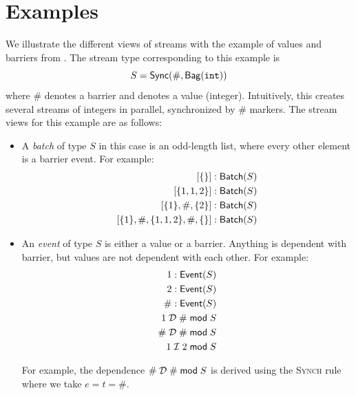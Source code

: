 \section{Examples}

We illustrate the different views of streams with the example of values and barriers from . The stream type corresponding to this example is
\[
S = \mathsf{Sync}({\#}, \mathsf{Bag}({\texttt{int}}))
\]
where $\#$ denotes a barrier and  denotes a value (integer).
Intuitively, this creates several streams of integers in parallel, synchronized by $\#$ markers.
The stream views for this example are as follows:
\begin{itemize}
\item A \emph{batch} of type $S$ in this case is an odd-length list, where every other element is a barrier event. For example:
\begin{align*}
  \batchtype{[\{\}]}{S}& \\
  \batchtype{[\{1, 1, 2\}]}{S}& \\
  \batchtype{[\{1\}, \#, \{2\}]}{S}& \\
  \batchtype{[\{1\}, \#, \{1, 1, 2\}, \#, \{\}]}{S}&
\end{align*}
\item An \emph{event} of type $S$ is either a value or a barrier. Anything is dependent with barrier, but values are not dependent with each other. For example:
\begin{align*}
  1: \mathsf{Event}({S})& \\
  2: \mathsf{Event}({S})& \\
  \#: \mathsf{Event}({S})& \\
  1 \;\mathcal{D}\; \# \;\mathsf{mod}\; {S}& \\
  \# \;\mathcal{D}\; \# \;\mathsf{mod}\; {S}& \\
  1 \;\mathcal{I}\; 2 \;\mathsf{mod}\; {S}&
\end{align*}

For example, the dependence $\# \;\mathcal{D}\; \# \;\mathsf{mod}\; {S}$ is derived using the \textsc{Synch} rule where we take $e = t = \#$.


\end{itemize}
